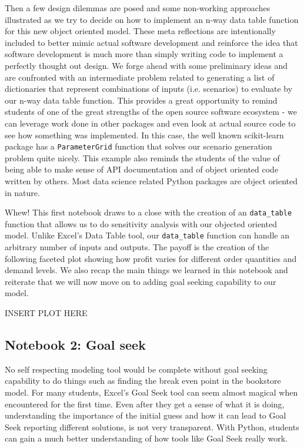 \documentclass[ited,blindrev]{informs3}              %
\newcommand{\code}[1]{\texttt{#1}}
\begin{document}
Then a few design dilemmas are posed and some non-working approaches illustrated as we try to decide on how to implement an n-way data table function for this new object oriented model. These meta reflections are intentionally included to better mimic actual software development and reinforce the idea that software development is much more than simply writing code to implement a perfectly thought out design. We forge ahead with some preliminary ideas and are confronted with an intermediate problem related to generating a list of dictionaries that represent combinations of inputs (i.e. scenarios) to evaluate by our n-way data table function. This provides a great opportunity to remind students of one of the great strengths of the open source software ecosystem - we can leverage work done in other packages and even look at actual source code to see how something was implemented. In this case, the well known scikit-learn package has a \code{ParameterGrid} function that solves our scenario generation problem quite nicely. This example also reminds the students of the value of being able to make sense of API documentation and of object oriented code written by others. Most data science related Python packages are object oriented in nature. 

Whew! This first notebook draws to a close with the creation of an \code{data_table} function that allows us to do sensitivity analysis with our objected oriented model. Unlike Excel's Data Table tool, our \code{data_table} function can handle an arbitrary number of inputs and outputs. The payoff is the creation of the following faceted plot showing how profit varies for different order quantities and demand levels. We also recap the main things we learned in this notebook and reiterate that we will now move on to adding goal seeking capability to our model.

INSERT PLOT HERE


\subsection{Notebook 2: Goal seek}

No self respecting modeling tool would be complete without goal seeking capability to do things such as finding the break even point in the bookstore model. For many students, Excel's Goal Seek tool can seem almost magical when encountered for the first time. Even after they get a sense of what it is doing, understanding the importance of the initial guess and how it can lead to Goal Seek reporting different solutions, is not very transparent. With Python, students can gain a much better understanding of how tools like Goal Seek really work. 
\end{document}

